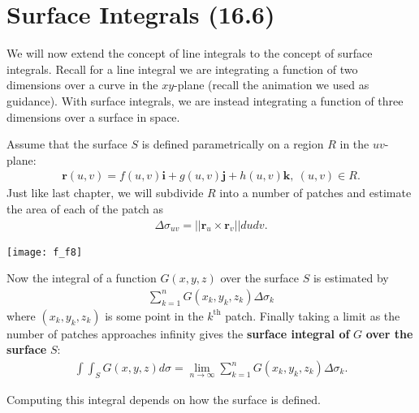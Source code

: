 \documentclass[12pt, letter]{article}
\theoremstyle{plain}
\numberwithin{theorem}{section}
\theoremstyle{definition}
\begin{document}
\section{Surface Integrals (16.6)}

We will now extend the concept of line integrals to the concept of surface integrals. Recall for a line integral we are integrating a function of two dimensions over a curve in the $xy$-plane (recall the animation we used as guidance). With surface integrals, we are instead integrating a function of three dimensions over a surface in space.

\bigskip

Assume that the surface $S$ is defined parametrically on a region $R$ in the $uv$-plane:
\begin{align*}
\bm{r}(u,v) = f(u,v)\bm{i}+g(u,v)\bm{j}+h(u,v)\bm{k}, \ (u,v)\in R.
\end{align*}
Just like last chapter, we will subdivide $R$ into a number of patches and estimate the area of each of the patch as
\begin{align*}
\Delta \sigma_{uv} = ||\bm{r}_u\times\bm{r}_v||dudv.
\end{align*}

\bigskip

\begin{center}
\texttt{[image: f\_f8]}
\end{center}

\bigskip

Now the integral of a function $G(x,y,z)$ over the surface $S$ is estimated by
\begin{align*}
\sum_{k=1}^n G(x_k,y_k,z_k)\Delta \sigma_k
\end{align*}
where $(x_k,y_k,z_k)$ is some point in the $k^{\text{th}}$ patch. Finally taking a limit as the number of patches approaches infinity gives the \textbf{surface integral of} $G$ \textbf{over the surface} $S$:
\begin{align*}
\int\int_S G(x,y,z)d\sigma = \lim_{n\to\infty} \sum_{k=1}^n G(x_k,y_k,z_k) \Delta \sigma_k.
\end{align*}

Computing this integral depends on how the surface is defined.

\bigskip

\hrulefill

\bigskip
\end{document}
